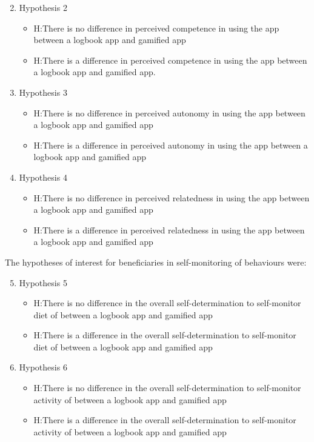 \begin{enumerate}
 \setcounter{enumi}{1}
\item{Hypothesis 2}
\begin{itemize}
\item{H}:There is no difference in perceived competence in using the app between a logbook app and gamified app
\item{H}:There is a difference in perceived competence in using the app between a logbook app and gamified app.
\end{itemize}
\item{Hypothesis 3}
\begin{itemize}
\item{H}:There is no difference in perceived autonomy in using the app between a logbook app and gamified app
\item{H}:There is a difference in perceived autonomy in using the app between a logbook app and gamified app
\end{itemize}
\item{Hypothesis 4}
\begin{itemize}
\item{H}:There is no difference in perceived relatedness in using the app between a logbook app and gamified app
\item{H}:There is a difference in perceived relatedness in using the app between a logbook app and gamified app
\end{itemize}
\end{enumerate}

The hypotheses of interest for beneficiaries in self-monitoring of behaviours were:

\begin{enumerate}
 \setcounter{enumi}{4}
\item{Hypothesis 5}
\begin{itemize}
\item{H}:There is no difference in the overall self-determination to self-monitor diet of between a logbook app and gamified app
\item{H}:There is a difference in the overall self-determination to self-monitor diet of between a logbook app and gamified app
\end{itemize}
\item{Hypothesis 6}
\begin{itemize}
\item{H}:There is no difference in the overall self-determination to self-monitor activity of between a logbook app and gamified app
\item{H}:There is a difference in the overall self-determination to self-monitor activity of between a logbook app and gamified app
\end{itemize}
\end{enumerate}

